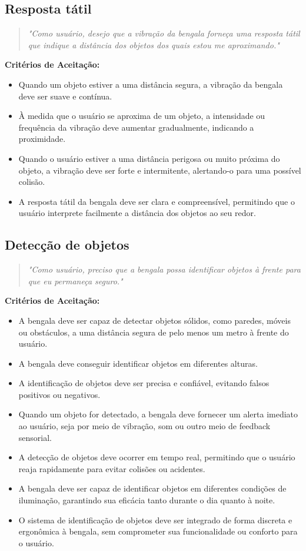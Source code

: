     \subsection{Resposta tátil}
    \begin{quote}
    \textit{"Como usuário, desejo que a vibração da bengala forneça uma resposta tátil que indique a distância dos objetos dos quais estou me aproximando."}
    \end{quote}    
    \noindent\textbf{Critérios de Aceitação:}
    \begin{itemize}
        \item Quando um objeto estiver a uma distância segura, a vibração da bengala deve ser suave e contínua.
        \item À medida que o usuário se aproxima de um objeto, a intensidade ou frequência da vibração deve aumentar gradualmente, indicando a proximidade.
        \item Quando o usuário estiver a uma distância perigosa ou muito próxima do objeto, a vibração deve ser forte e intermitente, alertando-o para uma possível colisão.
        \item A resposta tátil da bengala deve ser clara e compreensível, permitindo que o usuário interprete facilmente a distância dos objetos ao seu redor.
    \end{itemize}
        
    \subsection{Detecção de objetos}
    \begin{quote}
    \textit{"Como usuário, preciso que a bengala possa identificar objetos à frente para que eu permaneça seguro."}
    \end{quote}    
    \noindent\textbf{Critérios de Aceitação:}
    \begin{itemize}
        \item A bengala deve ser capaz de detectar objetos sólidos, como paredes, móveis ou obstáculos, a uma distância segura de pelo menos um metro à frente do usuário.
        \item A bengala deve conseguir identificar objetos em diferentes alturas.
        \item A identificação de objetos deve ser precisa e confiável, evitando falsos positivos ou negativos.
        \item Quando um objeto for detectado, a bengala deve fornecer um alerta imediato ao usuário, seja por meio de vibração, som ou outro meio de feedback sensorial.
        \item A detecção de objetos deve ocorrer em tempo real, permitindo que o usuário reaja rapidamente para evitar colisões ou acidentes.
        \item A bengala deve ser capaz de identificar objetos em diferentes condições de iluminação, garantindo sua eficácia tanto durante o dia quanto à noite.
        \item O sistema de identificação de objetos deve ser integrado de forma discreta e ergonômica à bengala, sem comprometer sua funcionalidade ou conforto para o usuário.
    \end{itemize}

